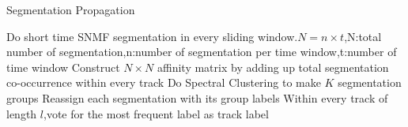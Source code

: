 \documentclass{beamer}
\begin{document}
\begin{algorithm}[H]
\caption{Segmentation Propagation}
Do short time SNMF segmentation in every sliding window.$N=n\times t$,N:total number of segmentation,n:number of segmentation per time window,t:number of time window\;
Construct $N\times N$ affinity matrix by adding up total segmentation co-occurrence within every track\;
Do Spectral Clustering to make $K$ segmentation groups\;
Reassign each segmentation with its group labels\;
Within every track of length $l$,vote for the most frequent label as track label\;
\end{algorithm}
\end{document}
